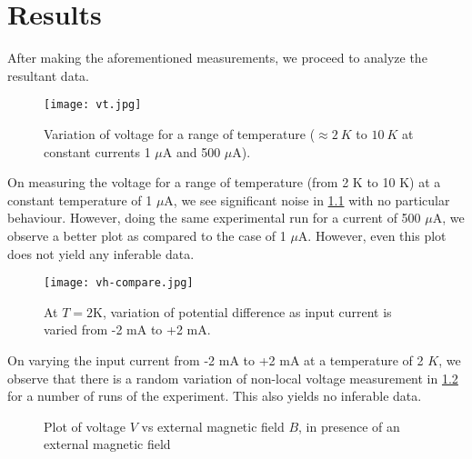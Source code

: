 \chapter{Results}

\label{chapter5}

After making the aforementioned measurements, we proceed to analyze the resultant data.



\begin{figure}[h!]
    \texttt{[image: vt.jpg]}
    \caption{Variation of voltage for a range of temperature (\( \approx 2 \: K \) to \( 10 \: K \) at constant currents 1 \( \mu \)A and 500 \( \mu \)A).}
    \label{fig:vt}
\end{figure}

On measuring the voltage for a range of temperature (from 2 K to 10 K) at a constant temperature of 1 \( \mu \)A, we see significant noise in \cref{fig:vt} with no particular behaviour. However, doing the same experimental run for a current of 500 \( \mu \)A, we observe a better plot as compared to the case of 1 \( \mu \)A. However, even this plot does not yield any inferable data.

\clearpage

\begin{figure}[h!]
    \texttt{[image: vh-compare.jpg]}
    \caption{At \( T = 2 \)K, variation of potential difference as input current is varied from -2 mA to +2 mA.}
    \label{fig:vh-compare}
\end{figure}

On varying the input current from -2 mA to +2 mA at a temperature of 2 $K$, we observe that there is a random variation of non-local voltage measurement in \cref{fig:vh-compare} for a number of runs of the experiment. This also yields no inferable data.

\begin{figure}[h!]
    
    \caption{Plot of voltage \( V \) vs external magnetic field \( B \), in presence of an external magnetic field}
\end{figure}
